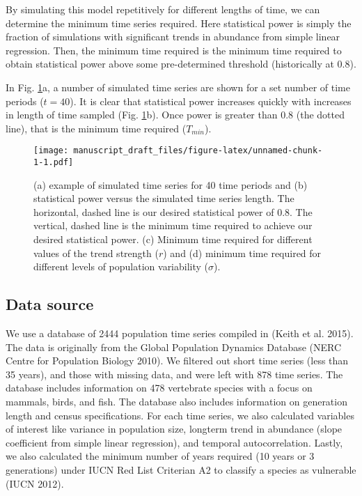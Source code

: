 \documentclass[12pt,]{article}
\begin{document}
By simulating this model repetitively for different lengths of time, we
can determine the minimum time series required. Here statistical power
is simply the fraction of simulations with significant trends in
abundance from simple linear regression. Then, the minimum time required
is the minimum time required to obtain statistical power above some
pre-determined threshold (historically at 0.8).

In Fig. \ref{fig:theoretical_approach}a, a number of simulated time
series are shown for a set number of time periods (\(t=40\)). It is
clear that statistical power increases quickly with increases in length
of time sampled (Fig. \ref{fig:theoretical_approach}b). Once power is
greater than 0.8 (the dotted line), that is the minimum time required
(\(T_{min}\)).

\begin{figure}[htbp]
\centering
\texttt{[image: manuscript\_draft\_files/figure-latex/unnamed-chunk-1-1.pdf]}
\caption{(a) example of simulated time series for 40 time periods and
(b) statistical power versus the simulated time series length. The
horizontal, dashed line is our desired statistical power of 0.8. The
vertical, dashed line is the minimum time required to achieve our
desired statistical power. (c) Minimum time required for different
values of the trend strength (\(r\)) and (d) minimum time required for
different levels of population variability
(\(\sigma\)).\label{fig:theoretical_approach}}
\end{figure}

\subsection{Data source}\label{data-source}

We use a database of 2444 population time series compiled in (Keith et
al. 2015). The data is originally from the Global Population Dynamics
Database (NERC Centre for Population Biology 2010). We filtered out
short time series (less than 35 years), and those with missing data, and
were left with 878 time series. The database includes information on 478
vertebrate species with a focus on mammals, birds, and fish. The
database also includes information on generation length and census
specifications. For each time series, we also calculated variables of
interest like variance in population size, longterm trend in abundance
(slope coefficient from simple linear regression), and temporal
autocorrelation. Lastly, we also calculated the minimum number of years
required (10 years or 3 generations) under IUCN Red List Criterian A2 to
classify a species as vulnerable (IUCN 2012).
\end{document}
